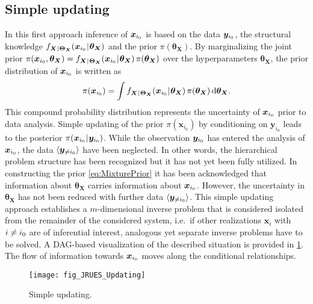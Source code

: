 \subsection{Simple updating} \label{sec:Combination:Updating}
In this first approach inference of \(\bm{x}_{i_0}\) is based on the data \(\bm{y}_{i_0}\), the structural knowledge
\(f_{\bm{X} {\:\!}|{\:\!} \bm{\Theta}_{\bm{X}}}(\bm{x}_{i_0} {\:\!}|{\:\!} \bm{\theta}_{\bm{X}})\) and the prior \(\pi(\bm{\theta}_{\bm{X}})\).
By marginalizing the joint prior \(\pi(\bm{x}_{i_0},\bm{\theta}_{\bm{X}}) = f_{\bm{X} {\:\!}|{\:\!} \bm{\Theta}_{\bm{X}}}(\bm{x}_{i_0} {\:\!}|{\:\!} \bm{\theta}_{\bm{X}}) \, \pi(\bm{\theta}_{\bm{X}})\)
over the hyperparameters \(\bm{\theta}_{\bm{X}}\), the prior distribution of \(\bm{x}_{i_0}\) is written as
\begin{equation} \label{eq:MixturePrior}
  \pi(\bm{x}_{i_0}) = \int f_{\bm{X} {\:\!}|{\:\!} \bm{\Theta}_{\bm{X}}}(\bm{x}_{i_0} {\:\!}|{\:\!} \bm{\theta}_{\bm{X}}) \, \pi(\bm{\theta}_{\bm{X}}) \, \mathrm{d} \bm{\theta}_{\bm{X}}.
\end{equation}
This compound probability distribution represents the uncertainty of \(\bm{x}_{i_0}\) prior to data analysis.
Simple updating of the prior \(\pi(\bm{x}_{i_0})\) by conditioning on \(\bm{y}_{i_0}\) leads to the posterior \(\pi(\bm{x}_{i_0} {\:\!}|{\:\!} \bm{y}_{i_0})\).
While the observation \(\bm{y}_{i_0}\) has entered the analysis of \(\bm{x}_{i_0}\), the data \(\langle{\bm{y}_{\neq i_0}}\rangle\) have been neglected.
In other words, the hierarchical problem structure has been recognized but it has not yet been fully utilized.
In constructing the prior \cref{eq:MixturePrior} it has been acknowledged that information about \(\bm{\theta}_{\bm{X}}\) carries information about \(\bm{x}_{i_0}\).
However, the uncertainty in \(\bm{\theta}_{\bm{X}}\) has not been reduced with further data \(\langle{\bm{y}_{\neq i_0}}\rangle\).
This simple updating approach establishes a \(m\)-dimensional inverse problem that is considered isolated from the remainder of the considered system,
i.e.\ if other realizations \(\bm{x}_i\) with \(i \neq i_0\) are of inferential interest, analogous yet separate inverse problems have to be solved.
A DAG-based visualization of the described situation is provided in \cref{fig:SimpleUpdating}.
The flow of information towards \(\bm{x}_{i_0}\) moves along the conditional relationships.
\begin{figure}[ht]
  \centering
  \texttt{[image: fig\_JRUES\_Updating]}
  \caption[Simple updating]{Simple updating.}
  \label{fig:SimpleUpdating}
\end{figure}

